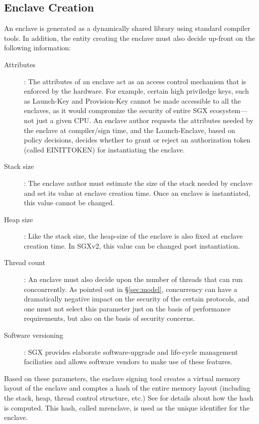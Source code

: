 \documentclass[10pt]{article}
\newcommand{\secref}[1]{\S\ref{#1}}
\newcommand{\mrenclave}{\textsf{mrenclave}}
\begin{document}
  \subsection{Enclave Creation}
  \label{sec:enclavecreateion}
  An enclave is generated as a dynamically shared library using
  standard compiler tools. In addition, the entity creating the
  enclave must also decide up-front on the following information:

  \begin{description}
    \item[Attributes]: The attributes of an enclave act as an access
      control mechanism that is enforced by the hardware. For example,
      certain high priviledge keys, such as Launch-Key and Provision-Key
      cannot be made accessible to all the enclaves, as it would
      compromize the security of entire SGX ecosystem---not just a
      given CPU. An enclave author requests the attributes needed by
      the enclave at compiler/sign time, and the Launch-Enclave, based
      on policy decisions, decides whether to grant or reject an
      authorization token (called \textsf{EINITTOKEN}) for instantiating
      the enclave.
    \item[Stack size]: The enclave author must estimate the size of the
      stack needed by enclave and set its value at enclave creation time.
      Once an enclave is instantiated, this value cannot be changed.

    \item[Heap size]: Like the stack size, the heap-size of the enclave
      is also fixed at enclave creation time. In SGXv2, this value can
      be changed post instantiation.

    \item[Thread count]: An enclave must also decide upon the number
      of threads that can run conconrrently. As pointed out in
      \secref{sec:model}, concurrency can have a dramatically negative
      impact on the security of the certain protocols, and one must
      not select this parameter just on the basis of performance
      requirements, but also on the basis of security concerns.

    \item[Software versioning]: SGX provides elaborate software-upgrade
      and life-cycle management faciliaties and allows software vendors
      to make use of these features.

  \end{description}
  Based on these parameters, the enclave signing tool creates a
  virtual memory layout of the enclave and comptes a hash of the
  entire memory layout (including the stack, heap, thread control
  structure, etc.)  See \cite{intelsdm} for details
  about how the hash is computed. This hash, called
  \mrenclave, is used as the unique identifier for the enclave.
\end{document}
